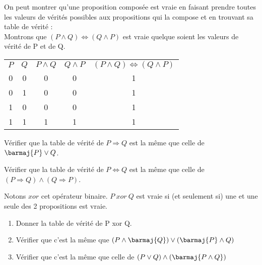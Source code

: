 \begin{methode}
	On peut montrer qu'une proposition composée est vraie en faisant prendre toutes les valeurs de vérités possibles aux propositions qui la compose et en trouvant sa table de vérité :\\
	
	Montrons que $(P\wedge Q)\Leftrightarrow(Q\wedge P)$ est vraie quelque soient les valeurs de vérité de P et de Q.
	
	\tabstyled
	\begin{center}
		\begin{tabular}{|c|c|c|c|c|}
			\rowcolor{UGLiPurple}
			\ccell\boldmath$P$ & \ccell\boldmath$Q$ & \ccell\boldmath$P\wedge Q$ & \ccell\boldmath$Q \wedge P$ & \ccell\boldmath$(P\wedge Q)\Leftrightarrow(Q\wedge P)$ \\
			0                  & 0                  & 0                          & 0                           & 1                                                      \\
			0                  & 1                  & 0                          & 0                           & 1                                                      \\
			1                  & 0                  & 0                          & 0                           & 1                                                      \\
			1                  & 1                  & 1                          & 1                           & 1                                                      \\
		\end{tabular}
	\end{center}
\end{methode}

\begin{exercice}[ : l'implication]
	Vérifier que la table de vérité de $P\Rightarrow Q$ est la même que celle de $\barmaj{P}\vee Q$.
\end{exercice}

\begin{exercice}
	Vérifier que la table de vérité de $P\Leftrightarrow Q$ est la même que celle de $(P\Rightarrow Q)\wedge(Q\Rightarrow P)$.
\end{exercice}

\begin{exercice}[ : le ou exclusif]
	
	Notons $xor$ cet opérateur binaire. $P\ xor\ Q$ est vraie si (et seulement si) une et une seule des 2 propositions est vraie.
	\begin{enumerate}
		\item 	Donner la table de vérité de P xor Q.
		\item 	Vérifier que c'est la même que $(P\wedge \barmaj{Q})\vee(\barmaj{P}\wedge Q)$
		\item 	Vérifier que c'est la même que celle de $(P\vee Q)\wedge(\barmaj{P\wedge Q})$
	\end{enumerate}
\end{exercice}

